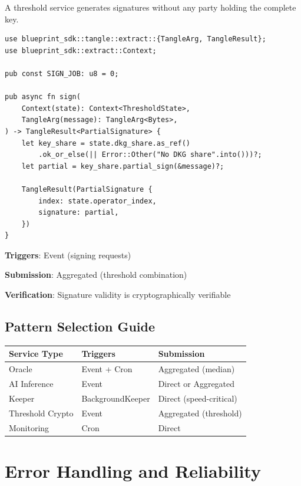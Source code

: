 \documentclass[11pt,a4paper]{article}
\begin{document}
A threshold service generates signatures without any party holding the complete key.

\begin{lstlisting}
use blueprint_sdk::tangle::extract::{TangleArg, TangleResult};
use blueprint_sdk::extract::Context;

pub const SIGN_JOB: u8 = 0;

pub async fn sign(
    Context(state): Context<ThresholdState>,
    TangleArg(message): TangleArg<Bytes>,
) -> TangleResult<PartialSignature> {
    let key_share = state.dkg_share.as_ref()
        .ok_or_else(|| Error::Other("No DKG share".into()))?;
    let partial = key_share.partial_sign(&message)?;

    TangleResult(PartialSignature {
        index: state.operator_index,
        signature: partial,
    })
}
\end{lstlisting}

\textbf{Triggers}: Event (signing requests)

\textbf{Submission}: Aggregated (threshold combination)

\textbf{Verification}: Signature validity is cryptographically verifiable

\subsection{Pattern Selection Guide}

\begin{center}
\begin{tabular}{|l|l|l|}
\hline
\textbf{Service Type} & \textbf{Triggers} & \textbf{Submission} \\
\hline
Oracle & Event + Cron & Aggregated (median) \\
AI Inference & Event & Direct or Aggregated \\
Keeper & BackgroundKeeper & Direct (speed-critical) \\
Threshold Crypto & Event & Aggregated (threshold) \\
Monitoring & Cron & Direct \\
\hline
\end{tabular}
\end{center}

\section{Error Handling and Reliability}
\end{document}
